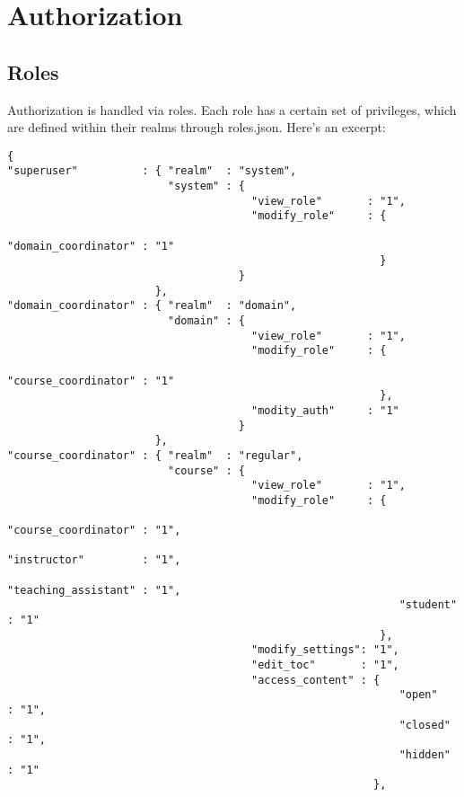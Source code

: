 \chapter{Authorization}
\section{Roles}\label{roles}
Authorization is handled via roles. Each role has a certain set of privileges, which are defined within their realms through roles.json. Here's an excerpt:
\begin{verbatim}
{
"superuser"          : { "realm"  : "system",
                         "system" : {
                                      "view_role"       : "1",
                                      "modify_role"     : {
                                                             "domain_coordinator" : "1"
                                                          }
                                    }
                       },
"domain_coordinator" : { "realm"  : "domain",
                         "domain" : {
                                      "view_role"       : "1",
                                      "modify_role"     : {
                                                             "course_coordinator" : "1"
                                                          },
                                      "modity_auth"     : "1"
                                    }
                       },
"course_coordinator" : { "realm"  : "regular",
                         "course" : {
                                      "view_role"       : "1",
                                      "modify_role"     : {
                                                             "course_coordinator" : "1",
                                                             "instructor"         : "1",
                                                             "teaching_assistant" : "1",
                                                             "student"            : "1"
                                                          },
                                      "modify_settings": "1",
                                      "edit_toc"       : "1",
                                      "access_content" : {
                                                             "open"               : "1",
                                                             "closed"             : "1",
                                                             "hidden"             : "1"
                                                         },

\end{verbatim}
